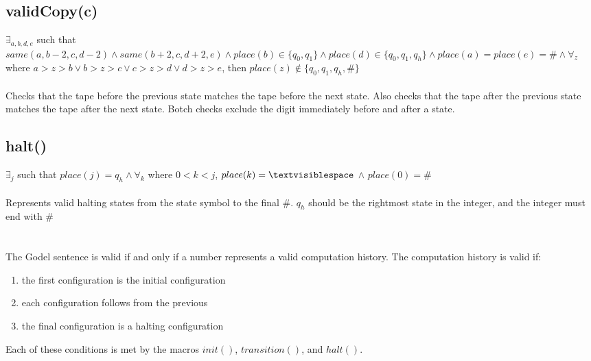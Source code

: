 \documentclass[letterpaper,notitlepage,twoside]{article}
\begin{document}
\subsection*{validCopy(c)}
$\exists_{a,b,d,e}$ such that $same(a,b-2,c,d-2) \wedge same(b+2,c,d+2,e) \wedge place(b) \in \lbrace q_0, q_1 \rbrace \wedge place(d) \in \lbrace q_0, q_1, q_h \rbrace \wedge place(a)=place(e)=\# \wedge \forall_z$ where $a > z > b \lor b > z > c \lor c > z > d \lor d > z > e$, then $place(z) \notin \lbrace q_0, q_1, q_h, \# \rbrace$
\\\\
Checks that the tape before the previous state matches the tape before the next state. Also checks that the tape after the previous state matches the tape after the next state. Botch checks exclude the digit immediately before and after a state.

\subsection*{halt()}
$\exists_j$ such that $place(j) = q_h \wedge \forall_k$ where $0 < k < j$, $place(k) = \textvisiblespace$ $\wedge$ $place(0) = \#$
\\\\
Represents valid halting states from the state symbol to the final $\#$. $q_h$ should be the rightmost state in the integer, and the integer must end with $\#$
\\\\\\
The Godel sentence is valid if and only if a number represents a valid computation history. The computation history is valid if:
\begin{enumerate}
\item the first configuration is the initial configuration
\item each configuration follows from the previous
\item the final configuration is a halting configuration
\end{enumerate}
Each of these conditions is met by the macros $init()$, $transition()$, and $halt()$.
\end{document}
